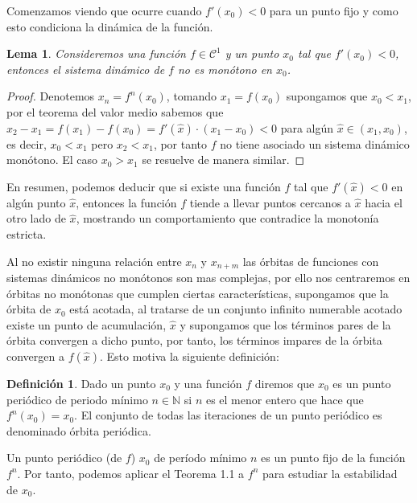\documentclass[12pt,a4paper]{report}
\newtheorem{lema}{Lema}[section]
\theoremstyle{definition}
\newtheorem{definicion}{Definición}[section]
\begin{document}
Comenzamos viendo que ocurre cuando $f'(x_0) < 0$ para un punto fijo y como esto condiciona la dinámica de la función.

\begin{lema}
    
Consideremos una función \( f \in \mathcal{C}^1 \) y un punto $x_0$ tal que \( f'(x_0) < 0 \), entonces el sistema dinámico de $f$ no es monótono en $x_0$.

\end{lema}

\begin{proof}
 Denotemos $x_n = f^n(x_0)$, tomando $x_1 = f(x_0)$ supongamos que $x_0 < x_1$,  por el teorema del valor medio sabemos que $x_{2} - x_1 = f(x_1) - f(x_{0}) = f'(\hat{x}) \cdot (x_{1} - x_{0}) < 0$ para algún $\hat{x} \in (x_{1}, x_{0})$, es decir, $x_0 < x_1$ pero $x_{2} < x_1 $, por tanto $f$ no tiene asociado un sistema dinámico monótono. 
 El caso $x_0 > x_1$ se resuelve de manera similar.
\end{proof}

En resumen, podemos deducir que si existe una función \( f \) tal que \( f'(\hat{x}) < 0 \) en algún punto \( \hat{x} \), entonces la función \( f \) tiende a llevar puntos cercanos a \( \hat{x} \) hacia el otro lado de \( \hat{x} \), mostrando un comportamiento que contradice la monotonía estricta.

Al no existir ninguna relación entre $x_n$ y $x_{n+m}$ las órbitas de funciones con sistemas dinámicos no monótonos son mas complejas, por ello nos centraremos en órbitas no monótonas que cumplen ciertas características, supongamos que la órbita de $x_0$ está acotada, al tratarse de un conjunto infinito numerable acotado existe un punto de acumulación, $\hat{x}$ y supongamos que los términos pares de la órbita convergen a dicho punto, por tanto, los términos impares de la órbita convergen a $f(\hat{x})$. Esto motiva la siguiente definición:

\begin{definicion}

Dado un punto $x_0$ y una función $f$ diremos que $x_0$ es un punto periódico de periodo mínimo $n \in \mathbb{N}$  si $n$ es el menor entero que hace que $f^n(x_0) = x_0$. El conjunto de todas las iteraciones de un punto periódico es denominado órbita periódica.

\end{definicion}

Un punto periódico (de $f$) $x_0$ de período mínimo $n$ es un punto fijo de la función $f^n$. Por tanto, podemos aplicar el Teorema 1.1 a $f^n$ para estudiar la estabilidad de $x_0$.
\end{document}
